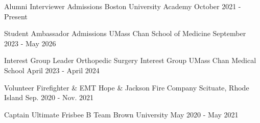 
\begin{cventries}

  \cventry
  {Alumni Interviewer} %
  {Admissions} %
  {Boston University Academy} %
  {October 2021 - Present} %
  {}

  \cventry
  {Student Ambassador} %
  {Admissions} %
  {UMass Chan School of Medicine} %
  {September 2023 - May 2026} %
  {}

  \cventry
  {Interest Group Leader} %
  {Orthopedic Surgery Interest Group} %
  {UMass Chan Medical School} %
  {April 2023 - April 2024} %
  {}

  \cventry
  {Volunteer Firefighter \& EMT} %
  {Hope \& Jackson Fire Company} %
  {Scituate, Rhode Island} %
  {Sep. 2020 - Nov. 2021} %
  {}

  \cventry
  {Captain} %
  {Ultimate Frisbee B Team} %
  {Brown University} %
  {May 2020 - May 2021} %
  {}

\end{cventries}
